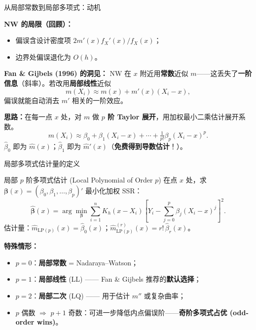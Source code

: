 \documentclass[aspectratio=169, 10pt]{beamer}
\begin{document}
\begin{frame}{从局部常数到局部多项式：动机}

  \textbf{NW 的局限（回顾）：}
  \begin{itemize}
    \item 偏误含设计密度项 $2 m'(x) f_X'(x)/f_X(x)$；
    \item 边界处偏误退化为 $O(h)$。
  \end{itemize}

  \begin{keybox}
    \textbf{Fan \& Gijbels (1996) 的洞见：}
    NW 在 $x$ 附近用\textbf{常数}近似 $m$——这丢失了\textbf{一阶信息}（斜率）。若改用\textbf{局部线性}近似
    \[
      m(X_i) \approx m(x) + m'(x)(X_i - x),
    \]
    偏误就能自动消去 $m'$ 相关的一阶效应。
  \end{keybox}

  \vspace{0.3em}

  \textbf{思路：}在每一点 $x$ 处，对 $m$ 做 \textbf{$p$ 阶 Taylor 展开}，用加权最小二乘估计展开系数。
  \[
    m(X_i) \approx \beta_0 + \beta_1(X_i - x) + \cdots + \tfrac{1}{p!}\beta_p(X_i - x)^p.
  \]
  $\hat\beta_0$ 即为 $\hat m(x)$；$\hat\beta_1$ 即为 $\hat m'(x)$（\textbf{免费得到导数估计}！）。

\end{frame}


\begin{frame}{局部多项式估计量的定义}

  \begin{definitionbox}{局部 $p$ 阶多项式估计 (Local Polynomial of Order $p$)}
    在点 $x$ 处，求 $\boldsymbol{\beta}(x) = (\beta_0, \beta_1, \ldots, \beta_p)'$ 最小化加权 SSR：
    \[
      \hat{\boldsymbol{\beta}}(x) = \arg\min_{\boldsymbol{\beta}} \sum_{i=1}^n K_h(x - X_i)\left[Y_i - \sum_{j=0}^p \beta_j (X_i - x)^j\right]^2.
    \]
    估计量：$\hat m_{\text{LP}(p)}(x) = \hat\beta_0(x)$；$\hat m^{(r)}_{\text{LP}(p)}(x) = r!\, \hat\beta_r(x)$。
  \end{definitionbox}

  \vspace{0.3em}

  \textbf{特殊情形：}
  \begin{itemize}
    \item $p=0$：\textbf{局部常数} = Nadaraya--Watson；
    \item $p=1$：\textbf{局部线性} (LL) —— Fan \& Gijbels 推荐的\textbf{默认选择}；
    \item $p=2$：\textbf{局部二次} (LQ) —— 用于估计 $m''$ 或复杂曲率；
    \item $p$ 偶数 $\Rightarrow$ $p+1$ 奇数：可进一步降低内点偏误阶——\textbf{奇阶多项式占优 (odd-order wins)}。
  \end{itemize}

\end{frame}
\end{document}
